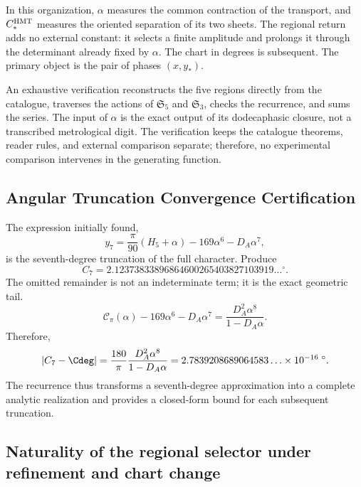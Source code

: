 In this organization, \(\alpha\) measures the common contraction of the transport, and \(C_*^{\rm HMT}\) measures the oriented separation of its two sheets. The regional return adds no external constant: it selects a finite amplitude and prolongs it through the determinant already fixed by \(\alpha\). The chart in degrees is subsequent. The primary object is the pair of phases \((x,y_*)\).

An exhaustive verification reconstructs the five regions directly
from the catalogue, traverses the actions of
\(\mathfrak S_5\) and \(\mathfrak S_3\), checks the recurrence, and sums the
series. The input of \(\alpha\) is the exact output of its
dodecaphasic closure, not a transcribed metrological digit. The verification keeps
the catalogue theorems, reader rules, and external comparison
separate; therefore, no experimental comparison intervenes in the generating
function.
\subsection{Angular Truncation Convergence Certification}
\label{sec:s102:c38:7:4}


The expression initially found,
\[
y_7=\frac\pi{90}(H_5+\alpha)-169\alpha^6-D_A\alpha^7,
\]
is the seventh-degree truncation of the full character. Produce
\[
C_7=2.12373833896864600265403827103919\ldots{}^\circ.
\]
The omitted remainder is not an indeterminate term; it is the exact geometric tail.
\[
\mathscr C_\pi(\alpha)
-169\alpha^6-D_A\alpha^7
=\frac{D_A^2\alpha^8}{1-D_A\alpha}.
\]
Therefore,
\[
\left|C_7-\Cdeg\right|
=\frac{180}{\pi}\frac{D_A^2\alpha^8}{1-D_A\alpha}
=2.7839208689064583\ldots\times10^{-16}\;{}^\circ.
\]
The recurrence thus transforms a seventh-degree approximation into a
complete analytic realization and provides a closed-form bound for each
subsequent truncation.

\subsection{Naturality of the regional selector under refinement and chart change}
\label{sec:s102:c38:7:5}


